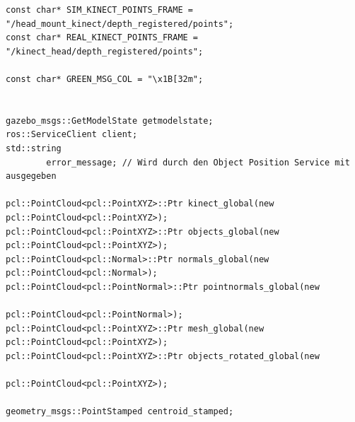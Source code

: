 \documentclass{suturo}
\begin{document}
\begin{verbatim}
const char* SIM_KINECT_POINTS_FRAME = "/head_mount_kinect/depth_registered/points";
const char* REAL_KINECT_POINTS_FRAME = "/kinect_head/depth_registered/points";

const char* GREEN_MSG_COL = "\x1B[32m";


gazebo_msgs::GetModelState getmodelstate;
ros::ServiceClient client;
std::string
        error_message; // Wird durch den Object Position Service mit ausgegeben

pcl::PointCloud<pcl::PointXYZ>::Ptr kinect_global(new pcl::PointCloud<pcl::PointXYZ>);
pcl::PointCloud<pcl::PointXYZ>::Ptr objects_global(new pcl::PointCloud<pcl::PointXYZ>);
pcl::PointCloud<pcl::Normal>::Ptr normals_global(new pcl::PointCloud<pcl::Normal>);
pcl::PointCloud<pcl::PointNormal>::Ptr pointnormals_global(new
												pcl::PointCloud<pcl::PointNormal>);
pcl::PointCloud<pcl::PointXYZ>::Ptr mesh_global(new pcl::PointCloud<pcl::PointXYZ>);
pcl::PointCloud<pcl::PointXYZ>::Ptr objects_rotated_global(new 	
											 	pcl::PointCloud<pcl::PointXYZ>);

geometry_msgs::PointStamped centroid_stamped;
\end{verbatim}
\end{document}
